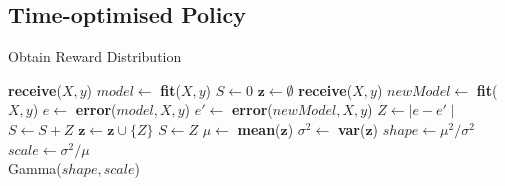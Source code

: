 \documentclass{mpaper}
\begin{document}
\begin{appendix}
        
    
    
\newpage
\section{Time-optimised Policy}\label{rewarddist}
\begin{algorithm}[H]
\caption{Obtain Reward Distribution}
\begin{algorithmic}
    \State \textbf{receive}($X, y$)
    \State $model \gets$ \textbf{fit}($X,y$)
    \State $S \gets 0$
    \State $\textbf{z} \gets \emptyset$
        \State \textbf{receive}($X, y$)
        \State $newModel \gets$ \textbf{fit}($X,y$)
        \State $e \gets$ \textbf{error}($model,X,y$)
        \State $e' \gets$ \textbf{error}($newModel,X,y$)
        \State $Z \gets \mid e - e' \mid$
        \State $S \gets S + Z$
        \State $\textbf{z} \gets \textbf{z} \cup \{Z\}$
            \State $S \gets Z$
        \EndIf
    \EndFor
    \State $\mu \gets$ \textbf{mean}($\textbf{z}$)
    \State $\sigma^2 \gets$ \textbf{var}($\textbf{z}$)
    \State $shape \gets \mu^2/\sigma^2$
    \State $scale \gets \sigma^2/\mu$\\
    \Return Gamma($shape, scale$)
    
\EndFunction
\end{algorithmic}
\end{algorithm}

\end{appendix}
\end{document}
